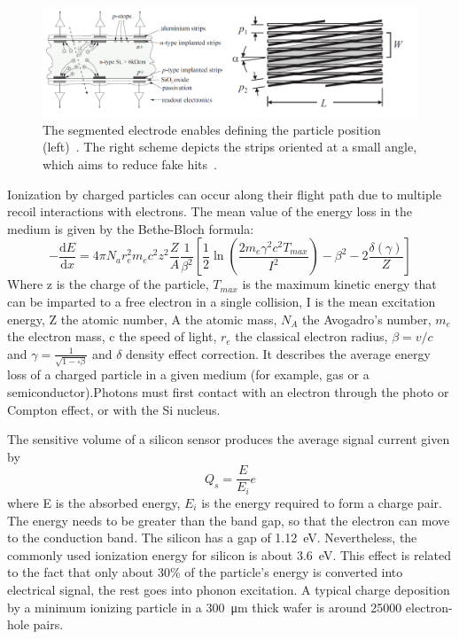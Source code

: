 \begin{figure}[!h]
\centering
\includegraphics[width=0.95\columnwidth]{Chapter2/images/silicons.png}
\caption{The segmented electrode enables defining the particle position (left)~\cite{Sokolov:2006vdx}. The right scheme depicts the strips oriented at a small angle, which aims to reduce fake hits~\cite{Spieler}.}
\label{fig_si}
\end{figure}
\newpage


Ionization by charged particles can occur along their flight path due to multiple recoil interactions with electrons. The mean value of the energy loss in the medium is given by the Bethe-Bloch formula:
\begin{equation}
-\dfrac{\mathrm dE}{\mathrm dx} = 4 \pi N_{a} r_{e}^{2} m_{e} c^{2} z^{2}  \dfrac{Z}{A} \frac{1}{\beta^{2}} \left[ \frac{1}{2}\ln(\frac{2m_{e}\gamma^{2}c^{2} T_{max}}{I^{2}}) - \beta^{2} -  2\frac{\delta(\gamma)}{Z}\right]
\end{equation}
Where z is the charge of the particle, $T_{max}$ is the maximum kinetic energy that can be imparted to a free electron in a single collision, I is the mean excitation energy, Z the atomic number, A the atomic mass, $N_{A}$ the Avogadro’s number, $m_{e}$ the electron mass, c the speed of light, $r_{e}$ the classical electron radius, $\beta = v/c$ and $\gamma = \frac{1}{\sqrt{1-\square\beta}}$ and $\delta$ density effect correction. It describes the average energy loss of a charged particle in a given medium (for example, gas or a semiconductor).Photons must first contact with an electron through the photo or Compton effect, or with the Si nucleus. 

The sensitive volume of a silicon sensor produces the average signal current given by 
\begin{equation}
    Q_{s} = \frac{E}{E_{i}}e
\end{equation}
where E is the absorbed energy, $E_{i}$ is the energy required to form a charge pair. The energy needs to be greater than the band gap, so that the electron can move to the conduction band. The silicon has a gap of 1.12~eV. Nevertheless, the commonly used ionization energy for silicon is about 3.6~eV. This effect is related to the fact that only about 30\% of the particle's energy is converted into electrical signal, the rest goes into phonon excitation. A typical charge deposition by a minimum ionizing particle in a \SI{300}{\micro\metre} thick wafer is around 25000 electron-hole pairs.

